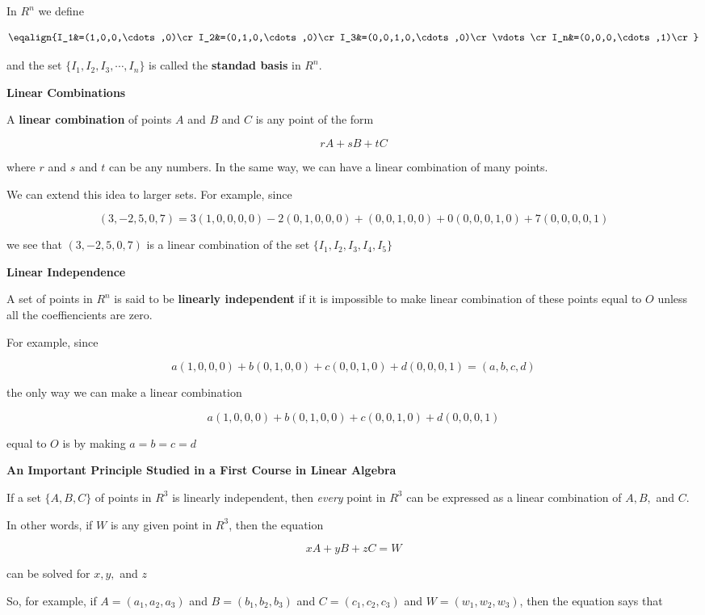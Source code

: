 \vskip 1mm
In $R^n$ we define

$$\eqalign{I_1&=(1,0,0,\cdots,0)\cr
	I_2&=(0,1,0,\cdots,0)\cr
	I_3&=(0,0,1,0,\cdots,0)\cr
	\vdots\cr
	I_n&=(0,0,0,\cdots,1)\cr}$$

and the set $\{I_1,I_2,I_3,\cdots,I_n\}$ is called the {\bf standad basis} in $R^n$.

\filbreak
\vskip 1cm
{\bf Linear Combinations}

\vskip 1mm
A {\bf linear combination} of points $A$ and $B$ and $C$ is any point of the form

$$rA+sB+tC$$

where $r$ and $s$ and $t$ can be any numbers. In the same way, we can have a linear combination of many points.

\vskip 1mm
We can extend this idea to larger sets. For example, since

$$(3,-2,5,0,7)=3(1,0,0,0,0)-2(0,1,0,0,0)+(0,0,1,0,0)+0(0,0,0,1,0)+7(0,0,0,0,1)$$

we see that $(3,-2,5,0,7)$ is a linear combination of the set $\{I_1,I_2,I_3,I_4,I_5\}$

\filbreak
\vskip 1cm
{\bf Linear Independence}

\vskip 1mm
A set of points in $R^n$ is said to be {\bf linearly independent} if it is impossible to make linear combination of these points equal to $O$ unless all the coeffiencients are zero.

\vskip 1mm
For example, since

$$a(1,0,0,0)+b(0,1,0,0)+c(0,0,1,0)+d(0,0,0,1)=(a,b,c,d)$$

the only way we can make a linear combination

$$a(1,0,0,0)+b(0,1,0,0)+c(0,0,1,0)+d(0,0,0,1)$$

equal to $O$ is by making $a=b=c=d$

\filbreak
\vskip 1cm
{\bf An Important Principle Studied in a First Course in Linear Algebra}

\vskip 1mm
If a set $\{A,B,C\}$ of points in $R^3$ is linearly independent, then {\it every} point in $R^3$ can be expressed as a linear combination of $A,B,$ and $C$.

\vskip 1mm
In other words, if $W$ is any given point in $R^3$, then the equation

$$xA+yB+zC=W$$

can be solved for $x,y,$ and $z$

\vskip 1mm
So, for example, if $A=(a_1,a_2,a_3)$ and $B=(b_1,b_2,b_3)$ and $C=(c_1,c_2,c_3)$ and $W=(w_1,w_2,w_3)$, then the equation says that

